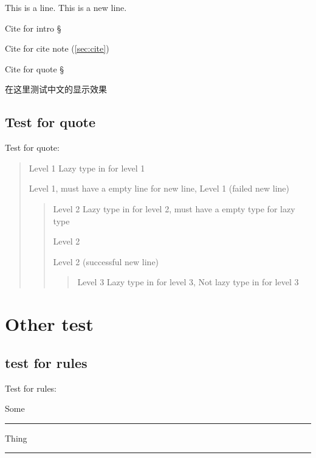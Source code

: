 This is a line.
This is a new line.

Cite for intro \S{}

Cite for cite note (\autoref{sec:cite})

Cite for quote \S{}

在这里测试中文的显示效果

\subsection{Test for quote}
\label{sec:quote}

Test for quote:

\begin{quote}

Level 1
Lazy type in for level 1

Level 1, must have a empty line for new line,
Level 1 (failed new line)

\begin{quote}

Level 2
Lazy type in for level 2, must have a empty type for lazy type

Level 2

Level 2 (successful new line)

\begin{quote}

Level 3
Lazy type in for level 3,
 Not lazy type in for level 3
\end{quote}
\end{quote}
\end{quote}

\newsinglepage

\section{Other test}
\label{set:other}

\subsection{test for rules}
\label{testforrules}

Test for rules:

Some

\begin{center}\rule{3in}{0.4pt}\end{center}


Thing

\begin{center}\rule{3in}{0.4pt}\end{center}


